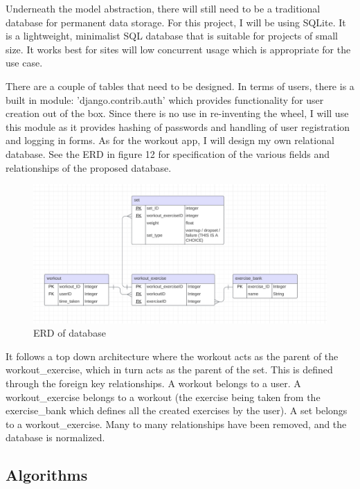 \documentclass{article}
\begin{document}
Underneath the model abstraction, there will still need to be a traditional database for permanent data storage. For this project, I will be using SQLite. It is a lightweight, minimalist SQL database that is suitable for projects of small size. It works best for sites will low concurrent usage which is appropriate for the use case. 

There are a couple of tables that need to be designed. In terms of users, there is a built in module: 'django.contrib.auth' which provides functionality for user creation out of the box. Since there is no use in re-inventing the wheel, I will use this module as it provides hashing of passwords and handling of user registration and logging in forms. As for the workout app, I will design my own relational database. See the ERD in figure 12 for specification of the various fields and relationships of the proposed database. 

\begin{figure}
  \centering
  \includegraphics[width=1\textwidth]{Figure 12.png}
  \caption{ERD of database}
\end{figure}

It follows a top down architecture where the workout acts as the parent of the workout\_exercise, which in turn acts as the parent of the set. This is defined through the foreign key relationships. A workout belongs to a user. A workout\_exercise belongs to a workout (the exercise being taken from the exercise\_bank which defines all the created exercises by the user). A set belongs to a workout\_exercise. Many to many relationships have been removed, and the database is normalized. 

\newpage

\subsection{Algorithms}
\end{document}
